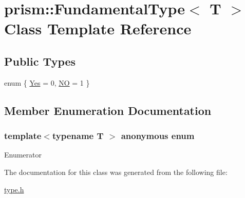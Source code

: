 \hypertarget{classprism_1_1_fundamental_type}{}\section{prism\+:\+:Fundamental\+Type$<$ T $>$ Class Template Reference}
\label{classprism_1_1_fundamental_type}
\subsection*{Public Types}
\begin{DoxyCompactItemize}
\item 
enum \{ \hyperlink{classprism_1_1_fundamental_type_ae83130851d5975bc5ba72692728e62bea57d5bccd471245b8a89246e93c7c9ad9}{Yes} = 0, 
\hyperlink{classprism_1_1_fundamental_type_ae83130851d5975bc5ba72692728e62bea8315675cfa73aab6de0691c9ecb697b1}{NO} = 1
 \}
\end{DoxyCompactItemize}


\subsection{Member Enumeration Documentation}
\subsubsection[{\texorpdfstring{anonymous enum}{anonymous enum}}]{\setlength{\rightskip}{0pt plus 5cm}template$<$typename T $>$ anonymous enum}\hypertarget{classprism_1_1_fundamental_type_ae83130851d5975bc5ba72692728e62be}{}\label{classprism_1_1_fundamental_type_ae83130851d5975bc5ba72692728e62be}
\begin{Desc}
\item[Enumerator]\par
\begin{description}
\item[{\em 
Yes\hypertarget{classprism_1_1_fundamental_type_ae83130851d5975bc5ba72692728e62bea57d5bccd471245b8a89246e93c7c9ad9}{}\label{classprism_1_1_fundamental_type_ae83130851d5975bc5ba72692728e62bea57d5bccd471245b8a89246e93c7c9ad9}
}]\item[{\em 
NO\hypertarget{classprism_1_1_fundamental_type_ae83130851d5975bc5ba72692728e62bea8315675cfa73aab6de0691c9ecb697b1}{}\label{classprism_1_1_fundamental_type_ae83130851d5975bc5ba72692728e62bea8315675cfa73aab6de0691c9ecb697b1}
}]\end{description}
\end{Desc}


The documentation for this class was generated from the following file\+:\begin{DoxyCompactItemize}
\item 
\hyperlink{type_8h}{type.\+h}\end{DoxyCompactItemize}
